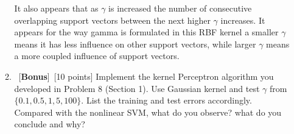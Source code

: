 \documentclass[12pt, fullpage,letterpaper]{article}
\begin{document}
\begin{enumerate}
\begin{enumerate}
	It also appears that as $\gamma$ is increased the number of consecutive overlapping support vectors between the next higher $\gamma$ increases.
	It appears for the way gamma is formulated in this RBF kernel a smaller $\gamma$ means it has less influence on other support vectors, while larger $\gamma$ means a more coupled influence of support vectors.
	
	\item~[\textbf{Bonus}]~[10 points] Implement the kernel Perceptron algorithm you developed in Problem 8 (Section 1). Use Gaussian kernel and test $\gamma$ from $\{ 0.1, 0.5, 1, 5, 100\}$. List the training and test errors accordingly. Compared with the nonlinear SVM, what do you observe? what do you conclude and why?
	
\end{enumerate} 

\end{enumerate}
\end{document}
